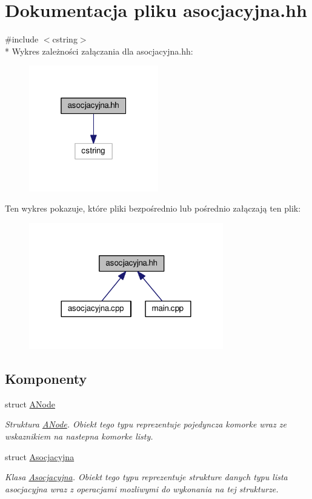 \hypertarget{asocjacyjna_8hh}{\section{Dokumentacja pliku asocjacyjna.\-hh}
\label{asocjacyjna_8hh}
}
{\ttfamily \#include $<$cstring$>$}\\*
Wykres zależności załączania dla asocjacyjna.\-hh\-:\nopagebreak
\begin{figure}[H]
\begin{center}
\leavevmode
\includegraphics[width=160pt]{asocjacyjna_8hh__incl}
\end{center}
\end{figure}
Ten wykres pokazuje, które pliki bezpośrednio lub pośrednio załączają ten plik\-:\nopagebreak
\begin{figure}[H]
\begin{center}
\leavevmode
\includegraphics[width=240pt]{asocjacyjna_8hh__dep__incl}
\end{center}
\end{figure}
\subsection*{Komponenty}
\begin{DoxyCompactItemize}
\item 
struct \hyperlink{struct_a_node}{A\-Node}
\begin{DoxyCompactList}\small\item\em Struktura \hyperlink{struct_a_node}{A\-Node}. Obiekt tego typu reprezentuje pojedyncza komorke wraz ze wskaznikiem na nastepna komorke listy. \end{DoxyCompactList}\item 
struct \hyperlink{struct_asocjacyjna}{Asocjacyjna}
\begin{DoxyCompactList}\small\item\em Klasa \hyperlink{struct_asocjacyjna}{Asocjacyjna}. Obiekt tego typu reprezentuje strukture danych typu lista asocjacyjna wraz z operacjami mozliwymi do wykonania na tej strukturze. \end{DoxyCompactList}\end{DoxyCompactItemize}

